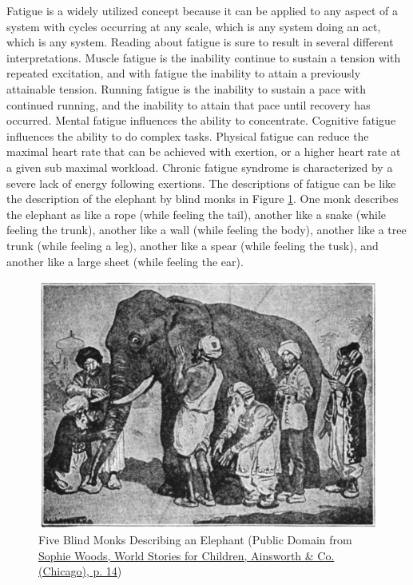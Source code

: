 Fatigue is a widely utilized concept because it can be applied to any aspect of a system with cycles occurring at any scale, which is any system doing an act, which is any system. Reading about fatigue is sure to result in several different interpretations. Muscle fatigue is the inability continue to sustain a tension with repeated excitation, and with fatigue the inability to attain a previously attainable tension. Running fatigue is the inability to sustain a pace with continued running, and the inability to attain that pace until recovery has occurred. Mental fatigue influences the ability to concentrate. Cognitive fatigue influences the ability to do complex tasks. Physical fatigue can reduce the maximal heart rate that can be achieved with exertion, or a higher heart rate at a given sub maximal workload. Chronic fatigue syndrome is characterized by a severe lack of energy following exertions. The descriptions of fatigue can be like the description of the elephant by blind monks in Figure \ref{fig:elephant}. One monk describes the elephant as like a rope (while feeling the tail), another like a snake (while feeling the trunk), another like a wall (while feeling the body), another like a tree trunk (while feeling a leg), another like a spear (while feeling the tusk), and another like a large sheet (while feeling the ear).    

\begin{figure}[!h]
    \centering
    \includegraphics[width=1\linewidth]{./figure/elephant.jpg}
    \caption{Five Blind Monks Describing an Elephant (\footnotesize{Public Domain from \href{https://commons.wikimedia.org/wiki/File:Blind_men_and_elephant.png}{Sophie Woods, World Stories for Children, Ainsworth & Co. (Chicago), p. 14}})}
    \label{fig:elephant}
\end{figure}

